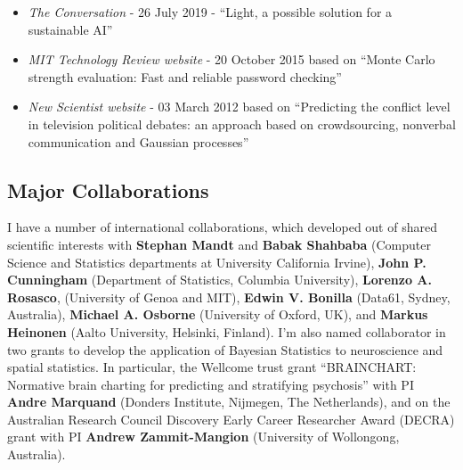 \documentclass[oneside, a4paper, onecolumn, 10pt]{article}
\begin{document}
\begin{itemize}
\item {\em The Conversation} - 26 July 2019 - ``Light, a possible solution for a sustainable AI''
\item {\em MIT Technology Review website} - 20 October 2015 based on ``Monte Carlo strength evaluation: Fast and reliable password checking''
\item {\em New Scientist website} - 03 March 2012 based on ``Predicting the conflict level in television political debates: an approach based on crowdsourcing, nonverbal communication and Gaussian processes''
\end{itemize}

\subsection*{Major Collaborations}

I have a number of international collaborations, which developed out of shared scientific interests with {\bf Stephan Mandt} and {\bf Babak Shahbaba} (Computer Science and Statistics departments at University California Irvine), {\bf John P. Cunningham} (Department of Statistics, Columbia University), {\bf Lorenzo A. Rosasco}, (University of Genoa and MIT), {\bf Edwin V. Bonilla} (Data61, Sydney, Australia), {\bf Michael A. Osborne} (University of Oxford, UK), and {\bf Markus Heinonen} (Aalto University, Helsinki, Finland).
I'm also named collaborator in two grants to develop the application of Bayesian Statistics to neuroscience and spatial statistics. 
In particular, the Wellcome trust grant ``BRAINCHART: Normative brain charting for predicting and stratifying psychosis'' with PI {\bf Andre Marquand} (Donders Institute, Nijmegen, The Netherlands), and on the Australian Research Council Discovery Early Career Researcher Award (DECRA) grant with PI {\bf Andrew Zammit-Mangion} (University of Wollongong, Australia).

\end{document}
